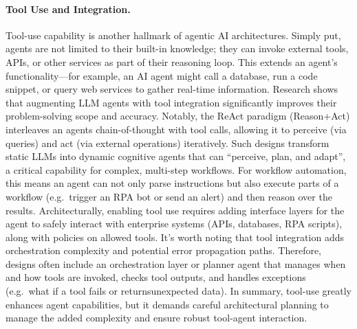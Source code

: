 \paragraph{Tool Use and Integration.} Tool-use capability is another hallmark of agentic AI architectures. Simply put, agents are not limited to their built-in knowledge; they can invoke external tools, APIs, or other services as part of their reasoning loop. This extends an agent's functionality---for example, an AI agent might call a database, run a code snippet, or query web services to gather real-time information. Research shows that augmenting LLM agents with tool integration significantly improves their problem-solving scope and accuracy. Notably, the ReAct paradigm (Reason+Act) interleaves an agents chain-of-thought with tool calls, allowing it to perceive (via queries) and act (via external operations) iteratively. Such designs transform static LLMs into dynamic cognitive agents that can “perceive, plan, and adapt”, a critical capability for complex, multi-step workflows. For workflow automation, this means an agent can not only parse instructions but also execute parts of a workflow (e.g.~trigger an RPA bot or send an alert) and then reason over the results. Architecturally, enabling tool use requires adding interface layers for the agent to safely interact with enterprise systems (APIs, databases, RPA scripts), along with policies on allowed tools. It's worth noting that tool integration adds orchestration complexity and potential error propagation paths. Therefore, designs often include an orchestration layer or planner agent that manages when and how tools are invoked, checks tool outputs, and handles exceptions (e.g.~what if a tool fails or returnsunexpected data). In summary, tool-use greatly enhances agent capabilities, but it demands careful
architectural planning to manage the added complexity and ensure robust tool-agent interaction. 

